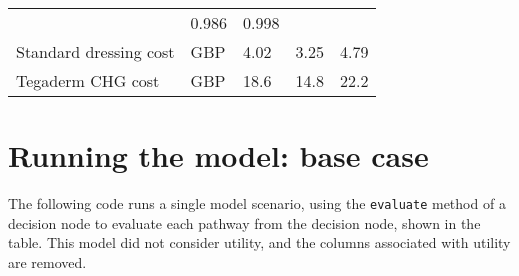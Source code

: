 \documentclass[
]{article}
\begin{document}
\begin{longtable}[]{@{}lllll@{}}
\begin{minipage}[t]{0.11\columnwidth}
\end{minipage} & \begin{minipage}[t]{0.11\columnwidth}\raggedright
0.986\strut
\end{minipage} & \begin{minipage}[t]{0.11\columnwidth}\raggedright
0.998\strut
\end{minipage}\tabularnewline
\begin{minipage}[t]{0.31\columnwidth}\raggedright
Standard dressing cost\strut
\end{minipage} & \begin{minipage}[t]{0.23\columnwidth}\raggedright
GBP\strut
\end{minipage} & \begin{minipage}[t]{0.11\columnwidth}\raggedright
4.02\strut
\end{minipage} & \begin{minipage}[t]{0.11\columnwidth}\raggedright
3.25\strut
\end{minipage} & \begin{minipage}[t]{0.11\columnwidth}\raggedright
4.79\strut
\end{minipage}\tabularnewline
\begin{minipage}[t]{0.31\columnwidth}\raggedright
Tegaderm CHG cost\strut
\end{minipage} & \begin{minipage}[t]{0.23\columnwidth}\raggedright
GBP\strut
\end{minipage} & \begin{minipage}[t]{0.11\columnwidth}\raggedright
18.6\strut
\end{minipage} & \begin{minipage}[t]{0.11\columnwidth}\raggedright
14.8\strut
\end{minipage} & \begin{minipage}[t]{0.11\columnwidth}\raggedright
22.2\strut
\end{minipage}\tabularnewline
\bottomrule
\end{longtable}

\hypertarget{running-the-model-base-case}{%
\section{Running the model: base
case}\label{running-the-model-base-case}}

The following code runs a single model scenario, using the
\texttt{evaluate} method of a decision node to evaluate each pathway
from the decision node, shown in the table. This model did not consider
utility, and the columns associated with utility are removed.
\end{document}
